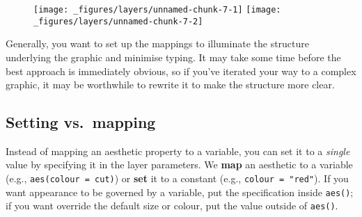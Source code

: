 \begin{Shaded}
\begin{Highlighting}[]
\OperatorTok{+}\StringTok{ }
\StringTok{  }\NormalTok{() }\OperatorTok{+}\StringTok{ }
\StringTok{  }\NormalTok{(} \NormalTok{, } \NormalTok{) }\OperatorTok{+}
\StringTok{  }\NormalTok{(} \NormalTok{)}

\OperatorTok{+}\StringTok{ }
\StringTok{  }\NormalTok{(}\NormalTok{(}\OperatorTok{+}\StringTok{ }
\StringTok{  }\NormalTok{(} \NormalTok{, } \NormalTok{) }\OperatorTok{+}\StringTok{ }
\StringTok{  }\NormalTok{(} \NormalTok{)}
\end{Highlighting}
\end{Shaded}

\begin{figure}[H]
  \texttt{[image: \_figures/layers/unnamed-chunk-7-1]}%
  \texttt{[image: \_figures/layers/unnamed-chunk-7-2]}
\end{figure}

Generally, you want to set up the mappings to illuminate the structure
underlying the graphic and minimise typing. It may take some time before
the best approach is immediately obvious, so if you've iterated your way
to a complex graphic, it may be worthwhile to rewrite it to make the
structure more clear.

\hypertarget{sub:setting-mapping}{%
\subsection{Setting vs.~mapping}\label{sub:setting-mapping}}

Instead of mapping an aesthetic property to a variable, you can set it
to a \emph{single} value by specifying it in the layer parameters. We
\textbf{map} an aesthetic to a variable (e.g.,
\texttt{aes(colour\ =\ cut)}) or \textbf{set} it to a constant (e.g.,
\texttt{colour\ =\ "red"}). If you want appearance to be governed by a
variable, put the specification inside \texttt{aes()}; if you want
override the default size or colour, put the value outside of
\texttt{aes()}. 


